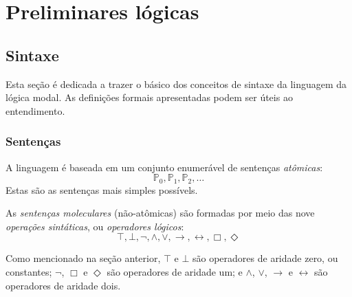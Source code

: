 




\section{Preliminares lógicas}
\subsection{Sintaxe}

Esta seção é dedicada a trazer o básico dos conceitos de sintaxe da linguagem da
lógica modal. As definições formais apresentadas podem ser úteis ao
entendimento.

\subsubsection{Sentenças} 
A linguagem é baseada em um conjunto enumerável de sentenças
\textit{at\^omicas}: 
\begin{equation}
    \mathbb{P}_0, \mathbb{P}_1, \mathbb{P}_2, \ldots 
\end{equation}
Estas são as sentenças mais simples possívels.

As \textit{sentenças moleculares} (não-at\^omicas) são formadas por meio das nove
\textit{operações sintáticas}, ou \textit{operadores lógicos}:
\begin{equation}
   \top, \bot, \neg, \wedge, \vee, \rightarrow, \leftrightarrow, \Box, \Diamond
\end{equation}

Como mencionado na seção anterior, $\top$ e $\bot$ são operadores de aridade
zero, ou constantes; $\neg$, $\Box$ e $\Diamond$ são operadores de aridade um; e
$\wedge$, $\vee$, $\rightarrow$ e $\leftrightarrow$ são operadores de aridade
dois.

